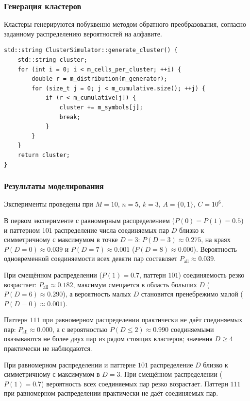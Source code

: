 \documentclass[14pt]{extarticle}
\begin{document}
\subsubsection{Генерация кластеров}
\label{sec:org8611ead}

Кластеры генерируются побуквенно методом обратного преобразования, согласно заданному распределению вероятностей на алфавите.

\begin{listing}[htbp]
\caption{Генерация одного кластера}
\begin{verbatim}
std::string ClusterSimulator::generate_cluster() {
    std::string cluster;
    for (int i = 0; i < m_cells_per_cluster; ++i) {
        double r = m_distribution(m_generator);
        for (size_t j = 0; j < m_cumulative.size(); ++j) {
            if (r < m_cumulative[j]) {
                cluster += m_symbols[j];
                break;
            }
        }
    }
    return cluster;
}
\end{verbatim}
\end{listing}
\subsubsection{Результаты моделирования}
\label{sec:orge21bf09}

Эксперименты проведены при \(M = 10\), \(n = 5\), \(k = 3\), \(A = \{0, 1\}\), \(C = 10^6\).

В первом эксперименте с равномерным распределением (\(P(0)=P(1)=0.5\)) и паттерном \(101\) распределение числа соединяемых пар \(D\) близко к симметричному с максимумом в точке \(D = 3\): \(P(D=3) \approx 0.275\), на краях \(P(D=0) \approx 0.039\) и \(P(D=7) \approx 0.001\) (\(P(D=8) \approx 0.000\)). Вероятность одновременной соединяемости всех девяти пар составляет \(P_{\text{all}} \approx 0.039\).

При смещённом распределении (\(P(1) = 0.7\), паттерн \(101\)) соединяемость резко возрастает: \(P_{\text{all}} \approx 0.182\), максимум смещается в область больших \(D\) (\(P(D=6) \approx 0.290\)), а вероятность малых \(D\) становится пренебрежимо малой (\(P(D=0) \approx 0.001\)).

Паттерн \(111\) при равномерном распределении практически не даёт соединяемых пар: \(P_{\text{all}} \approx 0.000\), а с вероятностью \(P(D \le 2) \approx 0.990\) соединяемыми оказываются не более двух пар из рядом стоящих кластеров; значения \(D \ge 4\) практически не наблюдаются.

При равномерном распределении и паттерне \(101\) распределение \(D\) близко к симметричному с максимумом в \(D = 3\). При смещённом распределении (\(P(1) = 0.7\)) вероятность всех соединяемых пар резко возрастает. Паттерн \(111\) при равномерном распределении практически не даёт соединяемых пар.
\end{document}
